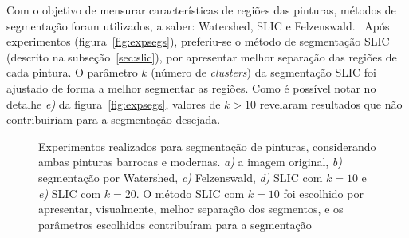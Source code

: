 Com o objetivo de mensurar características de regiões das pinturas,
métodos de segmentação foram utilizados, a saber: Watershed, SLIC e
Felzenswald.~\cite{gonzalez,luciano} Após experimentos
(figura~\ref{fig:expsegs}), preferiu-se o método de segmentação SLIC
(descrito na subseção~\ref{sec:slic}), por apresentar melhor separação
das regiões de cada pintura. O parâmetro $k$ (número
de \textit{clusters}) da segmentação SLIC foi ajustado de forma a
melhor segmentar as regiões. Como é possível notar no
detalhe \textit{e)} da figura~\ref{fig:expsegs}, valores de $k>10$
revelaram resultados que não contribuiriam para a segmentação
desejada.

\begin{figure}[h!]
\begin{center}
         \caption{Experimentos realizados para segmentação de
        pinturas, considerando ambas pinturas barrocas e
        modernas. \textit{a)} a imagem original, \textit{b)}
        segmentação por Watershed, \textit{c)}
        Felzenswald, \textit{d)} SLIC com $k=10$ e \textit{e)} SLIC
        com $k=20$. O método SLIC com $k=10$ foi escolhido por apresentar,
        visualmente, melhor separação dos segmentos, e os parâmetros
        escolhidos contribuíram para a seg\-men\-ta\-ção
}
\end{center}
\end{figure}
